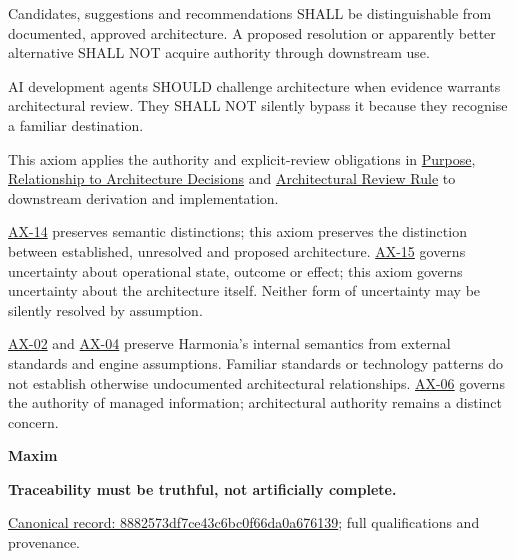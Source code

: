 Candidates, suggestions and recommendations SHALL be distinguishable from
documented, approved architecture. A proposed resolution or apparently
better alternative SHALL NOT acquire authority through downstream use.



AI development agents SHOULD challenge architecture when evidence
warrants architectural review. They SHALL NOT silently bypass it because
they recognise a familiar destination.



This axiom applies the authority and explicit-review obligations in
\href{\detokenize{../../../../governance/architectural-axioms.md#1-purpose}}{Purpose}, \href{\detokenize{../../../../governance/architectural-axioms.md#6-relationship-to-architecture-decisions}}{Relationship to Architecture Decisions}
and \href{\detokenize{../../../../governance/architectural-axioms.md#7-architectural-review-rule}}{Architectural Review Rule} to downstream
derivation and implementation.



\hyperref[element:d3fc6025dc7646d1b2020b51f7a44bfa]{AX-14} preserves semantic
distinctions; this axiom preserves the distinction between established,
unresolved and proposed architecture.
\hyperref[element:ef8abbaec37e4890ad78b9f263e67906]{AX-15} governs uncertainty
about operational state, outcome or effect; this axiom governs uncertainty
about the architecture itself. Neither form of uncertainty may be silently
resolved by assumption.



\hyperref[element:eee8c3783d964d18a7f9dcea85fcd4cf]{AX-02}
and \hyperref[element:54508cda80484a6caf95b901780eaf7d]{AX-04}
preserve Harmonia's internal semantics from external standards and engine
assumptions. Familiar standards or technology patterns do not establish
otherwise undocumented architectural relationships.
\hyperref[element:952c3b6148ce4fce94b69f99a0c2fec7]{AX-06} governs the authority
of managed information; architectural authority remains a distinct concern.



\par\medskip\textbf{Maxim}\par


\textbf{Traceability must be truthful, not artificially complete.}


{\footnotesize \href{../../../../continuum/motivation/principle/8882573df7ce43c6bc0f66da0a676139.md}{Canonical record: 8882573df7ce43c6bc0f66da0a676139}; full qualifications and provenance.}\par

